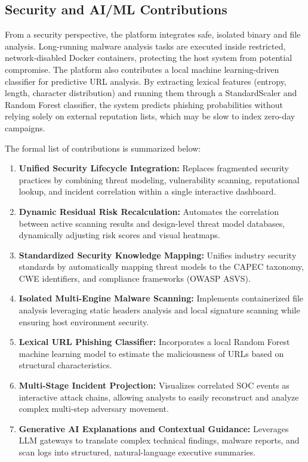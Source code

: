 \subsection{Security and AI/ML Contributions}
From a security perspective, the platform integrates safe, isolated binary and file analysis. Long-running malware analysis tasks are executed inside restricted, network-disabled Docker containers, protecting the host system from potential compromise. The platform also contributes a local machine learning-driven classifier for predictive URL analysis. By extracting lexical features (entropy, length, character distribution) and running them through a StandardScaler and Random Forest classifier, the system predicts phishing probabilities without relying solely on external reputation lists, which may be slow to index zero-day campaigns. 

The formal list of contributions is summarized below:
\begin{enumerate}
    \item \textbf{Unified Security Lifecycle Integration:} Replaces fragmented security practices by combining threat modeling, vulnerability scanning, reputational lookup, and incident correlation within a single interactive dashboard.
    \item \textbf{Dynamic Residual Risk Recalculation:} Automates the correlation between active scanning results and design-level threat model databases, dynamically adjusting risk scores and visual heatmaps.
    \item \textbf{Standardized Security Knowledge Mapping:} Unifies industry security standards by automatically mapping threat models to the CAPEC taxonomy, CWE identifiers, and compliance frameworks (OWASP ASVS).
    \item \textbf{Isolated Multi-Engine Malware Scanning:} Implements containerized file analysis leveraging static headers analysis and local signature scanning while ensuring host environment security.
    \item \textbf{Lexical URL Phishing Classifier:} Incorporates a local Random Forest machine learning model to estimate the maliciousness of URLs based on structural characteristics.
    \item \textbf{Multi-Stage Incident Projection:} Visualizes correlated SOC events as interactive attack chains, allowing analysts to easily reconstruct and analyze complex multi-step adversary movement.
    \item \textbf{Generative AI Explanations and Contextual Guidance:} Leverages LLM gateways to translate complex technical findings, malware reports, and scan logs into structured, natural-language executive summaries.
\end{enumerate}

